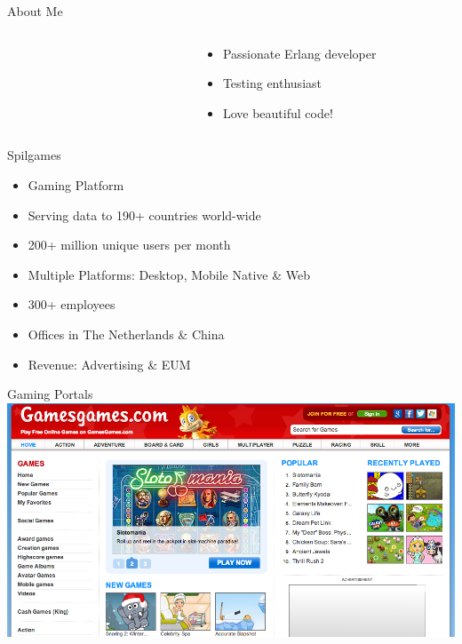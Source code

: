 \documentclass[aspectratio=169]{beamer}
\begin{document}
\begin{frame}{About Me}
\begin{columns}
\begin{column}[c]{0.2\textwidth}
        \end{column}
        \begin{column}[c]{0.05\textwidth}
        \end{column}
        \begin{column}[c]{0.7\textwidth}
            \begin{itemize}
                \item Passionate Erlang developer
                \item Testing enthusiast
                \item Love beautiful code!
            \end{itemize}
        \end{column}
    \end{columns}
\end{frame}

\begin{frame}{Spilgames}
    \begin{itemize}
       \item Gaming Platform
       \item Serving data to 190+ countries world-wide
       \item 200+ million unique users per month
       \item Multiple Platforms: Desktop, Mobile Native \& Web
       \item 300+ employees
       \item Offices in The Netherlands \& China
       \item Revenue: Advertising \& EUM
    \end{itemize}
\end{frame}

\begin{frame}{Gaming Portals}
    \includegraphics[width=\textwidth]{images/gamesgames.png}
\end{frame}
\end{document}
